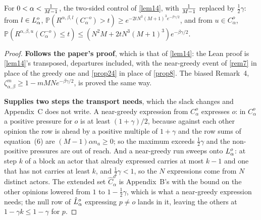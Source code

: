 \begin{lemma}
  \label{lem29}
  \leanok
  For $0 < \alpha < \tfrac{1}{M-1}$, the two-sided control of \ref{lem14}, with
  $\tfrac{1}{M-1}$ replaced by $\tfrac{1}{2}\gamma$: from $l \in L_\alpha^o$,
  $\mathbb{P}(R^{\alpha,\beta,l}(C_\alpha^{-o}) > t) \ge
  e^{-2tN^3(M+1)^3 e^{-\beta\gamma/2}}$, and from $u \in C_\alpha^o$,
  $\mathbb{P}(R^{\alpha,\beta,u}(C_\alpha^{-o}) \le t) \le (N^2M +
  2tN^3(M+1)^3) e^{-\beta\gamma/2}$.
\end{lemma}
\begin{proof}
  \leanok
  \textbf{Follows the paper's proof}, which is that of \ref{lem14}: the Lean
  proof is \ref{lem14}'s transposed, departures included, with the near-greedy
  event of \ref{rem7} in place of the greedy one and \ref{prop24} in place of
  \ref{prop8}.  The biased Remark~4, $\zeta_{\alpha,\beta}^m \ge 1 -
  mMNe^{-\beta\gamma/2}$, is proved the same way.

  \textbf{Supplies two steps the transport needs}, which the slack changes and
  Appendix~C does not write.  A near-greedy expression from $C_\alpha^o$
  expresses $o$: in $C_\alpha^o$ a positive pressure for $o$ is at least
  $(1+\gamma)/2$, because against each other opinion the row is ahead by a
  positive multiple of $1 + \gamma$ and the row sums of equation~(6) are
  $(M-1)\alpha n_a \ge 0$; so the maximum exceeds $\tfrac{1}{2}\gamma$ and the
  non-positive pressures are out of reach.  And a near-greedy run sweeps onto
  $L_\alpha^o$: at step $k$ of a block an actor that already expressed
  carries at most $k-1$ and one that has not carries at least $k$, and
  $\tfrac{1}{2}\gamma < 1$, so the $N$ expressions come from $N$ distinct
  actors.  The extended set $\hat{C}_\alpha^o$ is Appendix~B's with the bound on
  the other opinions lowered from $1$ to $1 - \tfrac{1}{2}\gamma$, which is what
  a near-greedy expression needs; the null row of $\hat{L}_\alpha^o$ expressing
  $p \ne o$ lands in it, leaving the others at $1 - \gamma k \le 1 - \gamma$ for
  $p$.
\end{proof}

